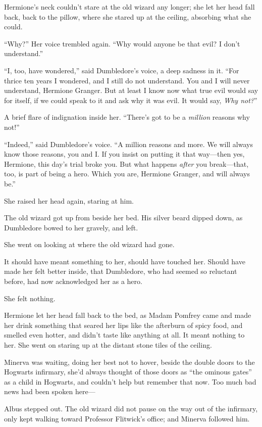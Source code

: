 Hermione’s neck couldn’t stare at the old wizard any longer; she let her head fall back, back to the pillow, where she stared up at the ceiling, absorbing what she could.

“Why?” Her voice trembled again. “Why would anyone be that evil? I don’t understand.”

“I, too, have wondered,” said Dumbledore’s voice, a deep sadness in it. “For thrice ten years I wondered, and I still do not understand. You and I will never understand, Hermione Granger. But at least I know now what true evil would say for itself, if we could speak to it and ask why it was evil. It would say, \emph{Why not?}”

A brief flare of indignation inside her. “There’s got to be a \emph{million} reasons why not!”

“Indeed,” said Dumbledore’s voice. “A million reasons and more. We will always know those reasons, you and I\@. If you insist on putting it that way—then yes, Hermione, this day’s trial broke you. But what happens \emph{after} you break—that, too, is part of being a hero. Which you are, Hermione Granger, and will always be.”

She raised her head again, staring at him.

The old wizard got up from beside her bed. His silver beard dipped down, as Dumbledore bowed to her gravely, and left.

She went on looking at where the old wizard had gone.

It should have meant something to her, should have touched her. Should have made her felt better inside, that Dumbledore, who had seemed so reluctant before, had now acknowledged her as a hero.

She felt nothing.

Hermione let her head fall back to the bed, as Madam Pomfrey came and made her drink something that seared her lips like the afterburn of spicy food, and smelled even hotter, and didn’t taste like anything at all. It meant nothing to her. She went on staring up at the distant stone tiles of the ceiling.

\later

Minerva was waiting, doing her best not to hover, beside the double doors to the Hogwarts infirmary, she’d always thought of those doors as “the ominous gates” as a child in Hogwarts, and couldn’t help but remember that now. Too much bad news had been spoken here—

Albus stepped out. The old wizard did not pause on the way out of the infirmary, only kept walking toward Professor Flitwick’s office; and Minerva followed him.

